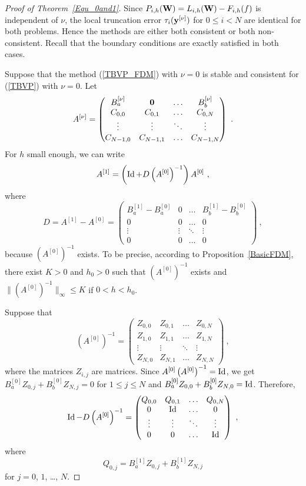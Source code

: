 \begin{proof}[Proof of Theorem~\ref{Equ_0and1}]
Since $P_{i,h}(\mathbf{W}) = L_{i,h}(\mathbf{W}) - F_{i,h}(f)$ is
independent of $\nu$, the local truncation error
$\mathbf{\tau}_i(\mathbf{y}^{[\nu]})$ for $0\leq i < N$ are identical for
both problems.  Hence the methods are either both consistent or both
non-consistent.  Recall that the boundary conditions are exactly
satisfied in both cases.

Suppose that the method (\ref{TBVP_FDM}) with $\nu=0$ is stable
and consistent for (\ref{TBVP}) with $\nu=0$.  Let
\[
A^{[\nu]} = \begin{pmatrix}
B_a^{[\nu]} & \mathbf{0} & \ldots & B_b^{[\nu]} \\
C_{0,0} & C_{0,1} & \ldots & C_{0,N} \\
\vdots & \vdots & \ddots & \vdots \\
C_{N-1,0} & C_{N-1,1} & \ldots & C_{N-1,N}
\end{pmatrix} \ .
\]
For $h$ small enough, we can write
\begin{equation}\label{TBVP_FDMp1}
A^{[1]} = \left( \operatorname{Id} + D
 \left(A^{[0]}\right)^{-1}\right)A^{[0]} \ ,
\end{equation}
where
\[
  D = A^{[1]} - A^{[0]}
= \begin{pmatrix}
B_a^{[1]} - B_a^{[0]} & 0 & \ldots & B_b^{[1]} - B_b^{[0]} \\
0 & 0 & \ldots & 0 \\
\vdots & \vdots & \ddots & \vdots \\
0 & 0 & \ldots &0
\end{pmatrix} \ ,
\]
because $\left(A^{[0]}\right)^{-1}$ exists.  To be precise, according to
Proposition~\ref{BasicFDM}, there exist $K>0$ and $h_0>0$ such that
$\left(A^{[0]}\right)^{-1}$ exists and
$\| \left(A^{[0]}\right)^{-1} \|_\infty \leq K$ if $0<h < h_0$.

Suppose that
\[
\left(A^{[0]}\right)^{-1}= \begin{pmatrix}
Z_{0,0} & Z_{0,1} & \ldots & Z_{0,N} \\
Z_{1,0} & Z_{1,1} & \ldots & Z_{1,N} \\
\vdots & \vdots & \ddots & \vdots \\
Z_{N,0} & Z_{N,1} & \ldots & Z_{N,N}
\end{pmatrix} \ ,
\]
where the matrices $Z_{i,j}$ are \nn matrices.
Since $A^{[0]} \left(A^{[0]}\right)^{-1}= \operatorname{Id}$, we get
$B_a^{[0]}Z_{0,j} + B_b^{[0]} Z_{N,j} = 0$ for $1\leq j \leq N$
and $B_a^{[0]}Z_{0,0} + B_b^{[0]} Z_{N,0} = \operatorname{Id}$.  Therefore,
\[
\operatorname{Id} - D \left(A^{[0]}\right)^{-1} = \begin{pmatrix}
Q_{0,0} & Q_{0,1} & \ldots & Q_{0,N} \\
0 & \operatorname{Id} &  \ldots & 0 \\
\vdots  & \vdots & \ddots & \vdots \\
0 & 0 & \ldots & \operatorname{Id}
\end{pmatrix} \ ,
\]
where
\[
Q_{0,j} = B_a^{[1]} Z_{0,j} + B_b^{[1]}Z_{N,j}
\]
for $j=0$, $1$, \ldots, $N$.


\end{proof}

